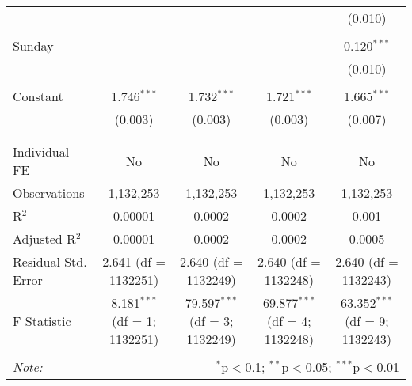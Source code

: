 \documentclass[
]{article}
\begin{document}
\begin{table}[!htbp]
{\begin{tabular}{@{\extracolsep{5pt}}lcccc}
  &  &  &  & (0.010) \\ 
  & & & & \\ 
 Sunday &  &  &  & 0.120$^{***}$ \\ 
  &  &  &  & (0.010) \\ 
  & & & & \\ 
 Constant & 1.746$^{***}$ & 1.732$^{***}$ & 1.721$^{***}$ & 1.665$^{***}$ \\ 
  & (0.003) & (0.003) & (0.003) & (0.007) \\ 
  & & & & \\ 
\hline \\[-1.8ex] 
Individual FE & No & No & No & No \\ 
Observations & 1,132,253 & 1,132,253 & 1,132,253 & 1,132,253 \\ 
R$^{2}$ & 0.00001 & 0.0002 & 0.0002 & 0.001 \\ 
Adjusted R$^{2}$ & 0.00001 & 0.0002 & 0.0002 & 0.0005 \\ 
Residual Std. Error & 2.641 (df = 1132251) & 2.640 (df = 1132249) & 2.640 (df = 1132248) & 2.640 (df = 1132243) \\ 
F Statistic & 8.181$^{***}$ (df = 1; 1132251) & 79.597$^{***}$ (df = 3; 1132249) & 69.877$^{***}$ (df = 4; 1132248) & 63.352$^{***}$ (df = 9; 1132243) \\ 
\hline 
\hline \\[-1.8ex] 
\textit{Note:}  & \multicolumn{4}{r}{$^{*}$p$<$0.1; $^{**}$p$<$0.05; $^{***}$p$<$0.01} \\ 
\end{tabular}
} 
\end{table} 
\newpage
\end{document}
